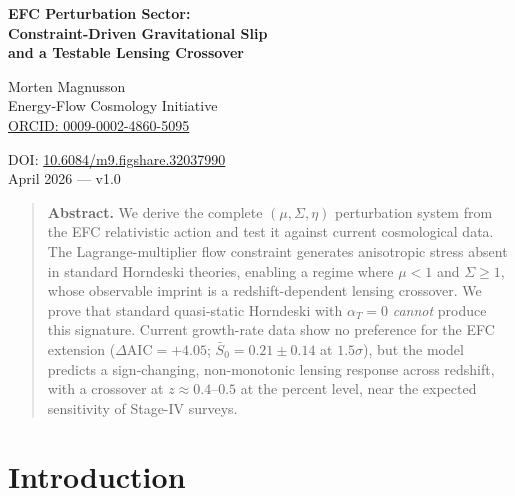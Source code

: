 \documentclass[11pt,a4paper]{article}
\begin{document}

\begin{center}
{\LARGE\bfseries EFC Perturbation Sector:\\[4pt]
Constraint-Driven Gravitational Slip\\[4pt]
and a Testable Lensing Crossover}

\vspace{10pt}
{\large Morten Magnusson}\\[2pt]
{\small Energy-Flow Cosmology Initiative}\\[2pt]
{\small \href{https://orcid.org/0009-0002-4860-5095}{ORCID: 0009-0002-4860-5095}}

\vspace{8pt}
{\small DOI: \href{https://doi.org/10.6084/m9.figshare.32037990}{10.6084/m9.figshare.32037990}}\\[4pt]
{\small April 2026 --- v1.0}
\end{center}

\vspace{6pt}


\begin{quote}\small
\textbf{Abstract.}
We derive the complete $(\mu,\Sigma,\eta)$ perturbation system from the
EFC relativistic action and test it against current cosmological data.
The Lagrange-multiplier flow constraint generates anisotropic stress
absent in standard Horndeski theories, enabling a regime where $\mu < 1$
and $\Sigma \geq 1$, whose observable imprint is a redshift-dependent
lensing crossover.
We prove that standard quasi-static Horndeski with $\alpha_T = 0$
\emph{cannot} produce this signature.
Current growth-rate data show no preference for the EFC extension
($\Delta\mathrm{AIC} = +4.05$; $\bar{S}_0 = 0.21 \pm 0.14$ at $1.5\sigma$),
but the model predicts a sign-changing, non-monotonic lensing response
across redshift, with a crossover at $z \approx 0.4$--$0.5$ at the
percent level, near the expected sensitivity of Stage-IV surveys.
\end{quote}

\section{Introduction}
\end{document}
